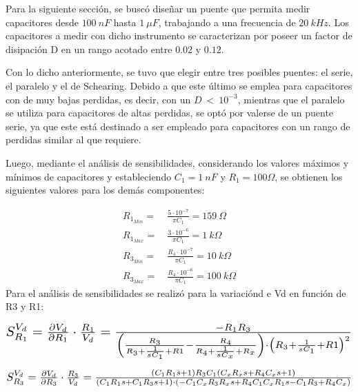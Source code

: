 
Para la siguiente sección, se buscó diseñar un puente que permita medir capacitores desde $100 \ nF$ hasta $1 \ \mu F$, trabajando a una frecuencia de $20 \ kHz$. Los capacitores a medir con dicho instrumento se caracterizan por poseer un factor de disipación D en un rango acotado entre $0.02$ y $0.12$.

Con lo dicho anteriormente, se tuvo que elegir entre tres posibles puentes: el serie, el paralelo y el de Schearing. Debido a que este último se emplea para capacitores con de muy bajas perdidas, es decir, con un $D \ < \ 10^{-3}$, mientras que el paralelo se utiliza para capacitores de altas perdidas, se optó por valerse de un puente serie, ya que este está destinado a ser empleado para capacitores con un rango de perdidas similar al que requiere.


Luego, mediante el análisis de sensibilidades, considerando los valores máximos y mínimos de capacitores y estableciendo $C_1 = 1 \ nF$ y $R_1 = 100 \Omega$, se obtienen los siguientes valores para los demás componentes:

\begin{equation*}
\begin{split}
	R_{1_{Min}} =& \ \frac{5 \cdot 10^{-7}}{\pi C_1} = 159 \ \Omega \\
	R_{1_{Max}} =& \ \frac{3 \cdot 10^{-6}}{\pi C_1} = 1 \ k\Omega \\
	R_{3_{Min}} =& \ \frac{R_4 \cdot 10^{-7}}{\pi C_1} = 10 \ k\Omega \\
	R_{3_{Max}} =& \ \frac{R_4 \cdot 10^{-6}}{\pi C_1} = 100 \ k\Omega
\end{split}
\end{equation*}
Para el análisis de sensibilidades se realizó para la variaciónd e Vd en función de R3 y R1:

\begin{align*}
\scalebox{1.5}{$
S_{R_1}^{V_d} = \frac{\partial V_d}{\partial R_1} \cdot \frac{R_1}{V_d}=
\frac{-R_1R_3}{\left( \frac{R_3}{R_3+\frac{1}{sC_1}+R1}-\frac{R_4}{R_4+\frac{1}{sC_x}+R_x} \right) \cdot  \left( R_3+\frac{1}{sC_1}+R1\right)^2}
$}
\end{align*}

\begin{align*}
\scalebox{1.5}{$
S_{R_3}^{V_d} = \frac{\partial V_d}{\partial R_3} \cdot \frac{R_3}{V_d}=\frac{(C_1R_1s+1)R_3C_1(C_xR_xs+R_4C_xs+1)}{(C_1R_1s+C_1R_3s+1)\cdot (-C_1C_xR_3R_xs+R_4C_1C_xR_1s-C_1R_3+R_4C_x)}
$}
\end{align*}


%

